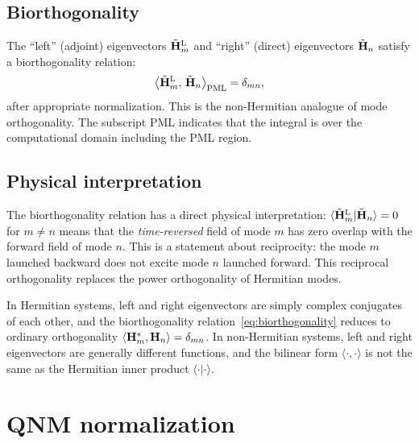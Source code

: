 \subsection{Biorthogonality}
\label{ssec:biorthogonality}

The ``left'' (adjoint) eigenvectors $\tilde{\mathbf{H}}_m^{\mathrm{L}}$ and
``right'' (direct) eigenvectors $\tilde{\mathbf{H}}_n$ satisfy a biorthogonality
relation:
\begin{equation}
 \bigl\langle\tilde{\mathbf{H}}_m^{\mathrm{L}},\,
 \tilde{\mathbf{H}}_n\bigr\rangle_{\mathrm{PML}}
 = \delta_{mn},
 \label{eq:biorthogonality}
\end{equation}
after appropriate normalization. This is the non-Hermitian analogue of
mode orthogonality. The subscript PML indicates that the integral is over
the computational domain including the PML region.

\subsection{Physical interpretation}
\label{ssec:biorthogonal-physics}

The biorthogonality relation has a direct physical interpretation:
$\langle\tilde{\mathbf{H}}_m^{\mathrm{L}}|\tilde{\mathbf{H}}_n\rangle = 0$ for
$m \neq n$ means that the \emph{time-reversed} field of mode $m$
has zero overlap with the forward field of mode $n$. This is a
statement about reciprocity: the mode $m$ launched backward does not
excite mode $n$ launched forward. This reciprocal orthogonality replaces
the power orthogonality of Hermitian modes.

\begin{booknote}
In Hermitian systems, left and right eigenvectors are simply complex
conjugates of each other, and the biorthogonality
relation~\eqref{eq:biorthogonality} reduces to ordinary orthogonality
$\langle\mathbf{H}_m^*,\mathbf{H}_n\rangle = \delta_{mn}$. In non-Hermitian systems,
left and right eigenvectors are generally different functions, and the
bilinear form $\langle\cdot,\cdot\rangle$ is not the same as the
Hermitian inner product $\langle\cdot|\cdot\rangle$.
\end{booknote}


\section{QNM normalization}
\label{sec:qnm-normalization}


